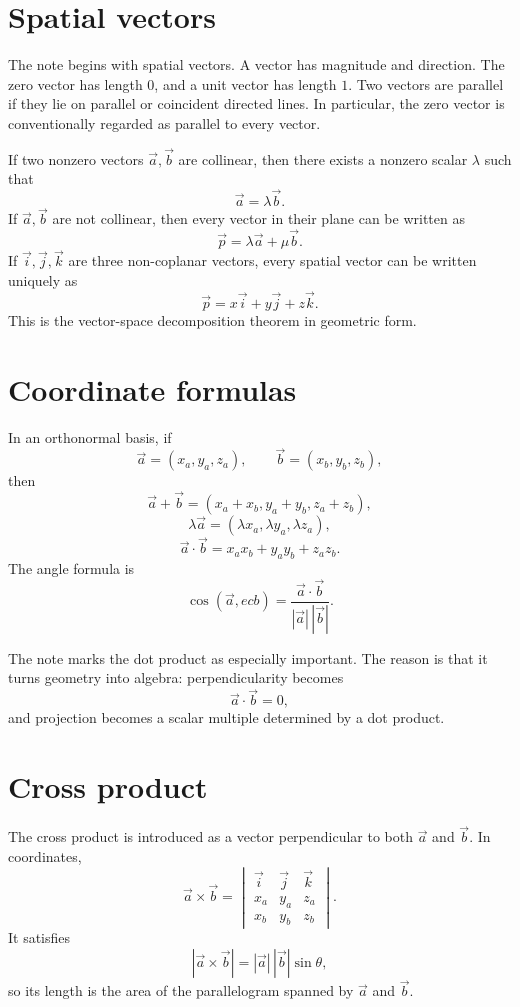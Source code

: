 
\section{Spatial vectors}

The note begins with spatial vectors.  A vector has magnitude and direction.  The zero vector has length \(0\), and a unit vector has length \(1\).  Two vectors are parallel if they lie on parallel or coincident directed lines.  In particular, the zero vector is conventionally regarded as parallel to every vector.

If two nonzero vectors \(\vec a,\vec b\) are collinear, then there exists a nonzero scalar \(\lambda\) such that
\[
  \vec a=\lambda\vec b.
\]
If \(\vec a,\vec b\) are not collinear, then every vector in their plane can be written as
\[
  \vec p=\lambda\vec a+\mu\vec b.
\]
If \(\vec i,\vec j,\vec k\) are three non-coplanar vectors, every spatial vector can be written uniquely as
\[
  \vec p=x\vec i+y\vec j+z\vec k.
\]
This is the vector-space decomposition theorem in geometric form.

\section{Coordinate formulas}

In an orthonormal basis, if
\[
  \vec a=(x_a,y_a,z_a),\qquad \vec b=(x_b,y_b,z_b),
\]
then
\[
  \vec a+\vec b=(x_a+x_b,y_a+y_b,z_a+z_b),
\]
\[
  \lambda\vec a=(\lambda x_a,\lambda y_a,\lambda z_a),
\]
\[
  \vec a\cdot\vec b=x_ax_b+y_ay_b+z_az_b.
\]
The angle formula is
\[
  \cos(\vec a,
ec b)=\frac{\vec a\cdot\vec b}{|\vec a|\,|\vec b|}.
\]

The note marks the dot product as especially important.  The reason is that it turns geometry into algebra: perpendicularity becomes
\[
  \vec a\cdot\vec b=0,
\]
and projection becomes a scalar multiple determined by a dot product.

\section{Cross product}

The cross product is introduced as a vector perpendicular to both \(\vec a\) and \(\vec b\).  In coordinates,
\[
  \vec a\times\vec b=
  \begin{vmatrix}
  \vec i&\vec j&\vec k\\
  x_a&y_a&z_a\\
  x_b&y_b&z_b
  \end{vmatrix}.
\]
It satisfies
\[
  |\vec a\times\vec b|=|\vec a|\,|\vec b|\sin\theta,
\]
so its length is the area of the parallelogram spanned by \(\vec a\) and \(\vec b\).

